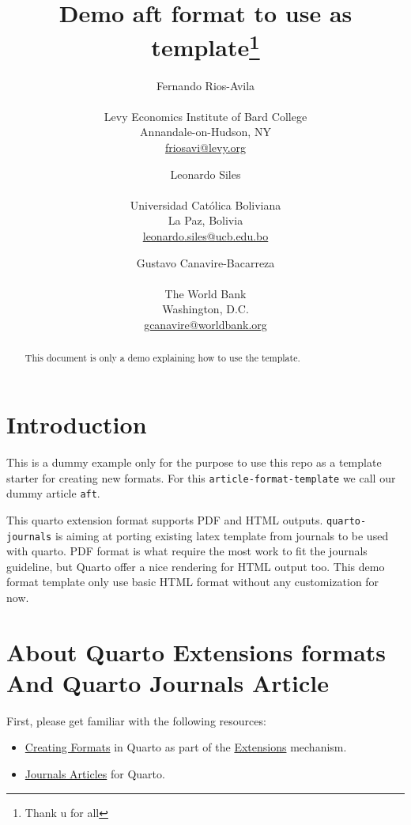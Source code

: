 \documentclass[
  11pts,
]{article}
\title{Demo aft format to use as template\thanks{Thank u for all}}
\author{
Fernando Rios-Avila\corref{cor1}\\
\\
Levy Economics Institute of Bard College\\
Annandale-on-Hudson, NY\\
\href{mailto:friosavi@levy.org}{friosavi@levy.org}\and 
Leonardo Siles\\
\\
Universidad Católica Boliviana\\
La Paz, Bolivia\\
\href{mailto:leonardo.siles@ucb.edu.bo}{leonardo.siles@ucb.edu.bo}\and 
Gustavo Canavire-Bacarreza\\
\\
The World Bank\\
Washington, D.C.\\
\href{mailto:gcanavire@worldbank.org}{gcanavire@worldbank.org}}
\date{}
\providecommand{\tightlist}{%
  \setlength{\itemsep}{0pt}\setlength{\parskip}{0pt}}\usepackage{longtable,booktabs,array}
\begin{document}
\def\spacingset#1{\renewcommand{\baselinestretch}%
{#1}\small\normalsize} \spacingset{1}


\maketitle
\begin{abstract}
This document is only a demo explaining how to use the template.
\end{abstract}


\thispagestyle{empty}
\clearpage{}
\newpage
\spacingset{1.2} %
\section*{Introduction}\label{sec-intro}

This is a dummy example only for the purpose to use this repo as a
template starter for creating new formats. For this
\texttt{article-format-template} we call our dummy article \texttt{aft}.

This quarto extension format supports PDF and HTML outputs.
\texttt{quarto-journals} is aiming at porting existing latex template
from journals to be used with quarto. PDF format is what require the
most work to fit the journals guideline, but Quarto offer a nice
rendering for HTML output too. This demo format template only use basic
HTML format without any customization for now.

\section{About Quarto Extensions formats And Quarto Journals
Article}\label{about-quarto-extensions-formats-and-quarto-journals-article}

First, please get familiar with the following resources:

\begin{itemize}
\tightlist
\item
  \href{https://quarto.org/docs/extensions/formats.html}{Creating
  Formats} in Quarto as part of the
  \href{https://quarto.org/docs/extensions/}{Extensions} mechanism.
\item
  \href{https://quarto.org/docs/journals/}{Journals Articles} for
  Quarto.
\end{itemize}
\end{document}

